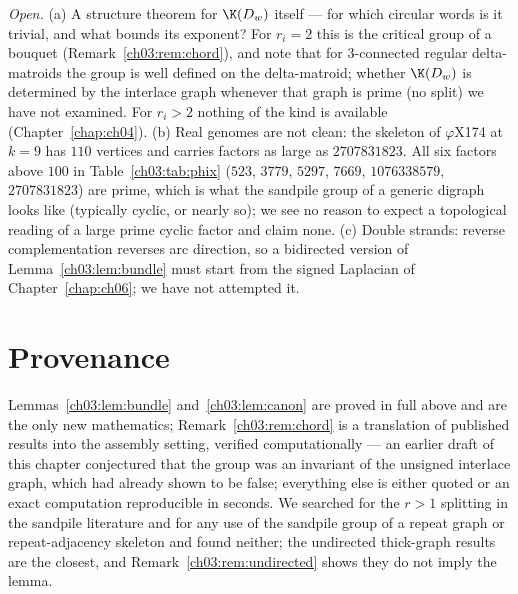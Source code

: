 \emph{Open.} (a) A structure theorem for $\K(D_w)$ itself --- for which circular words is
it trivial, and what bounds its exponent? For $r_i=2$ this is the critical group of a
bouquet (Remark~\ref{ch03:rem:chord}), and \cite{MMN} note that for $3$-connected regular
delta-matroids the group is well defined on the delta-matroid; whether $\K(D_w)$ is
determined by the interlace graph whenever that graph is prime (no split) we have not
examined. For $r_i>2$ nothing of the kind is available (Chapter~\ref{chap:ch04}). (b) Real genomes are not clean: the
skeleton of $\varphi$X174 at $k=9$ has $110$ vertices and carries factors as large as
$2707831823$. All six factors above $100$ in Table~\ref{ch03:tab:phix} ($523$, $3779$, $5297$,
$7669$, $1076338579$, $2707831823$) are prime, which is what the sandpile group of a
generic digraph looks like (typically cyclic, or nearly so); we see no reason to expect a
topological reading of a large prime cyclic factor and claim none. (c) Double strands: reverse complementation reverses arc
direction, so a bidirected version of Lemma~\ref{ch03:lem:bundle} must start from the signed
Laplacian of Chapter~\ref{chap:ch06}; we have not attempted it.

\section*{Provenance}

Lemmas~\ref{ch03:lem:bundle} and~\ref{ch03:lem:canon} are proved in full
above and are the only new mathematics; Remark~\ref{ch03:rem:chord} is a translation of
published results \cite{ABS,MMN} into the assembly setting, verified computationally ---
an earlier draft of this chapter conjectured that the group was an invariant of the unsigned
interlace graph, which \cite[Rem.~6.7]{MMN} had already shown to be false; everything
else is either quoted or an exact computation reproducible in seconds. We searched for the $r>1$ splitting in the sandpile literature and for any use of
the sandpile group of a repeat graph or repeat-adjacency skeleton and found neither; the
undirected thick-graph results \cite{ChenSchedler,Alar} are the closest, and
Remark~\ref{ch03:rem:undirected} shows they do not imply the lemma.
